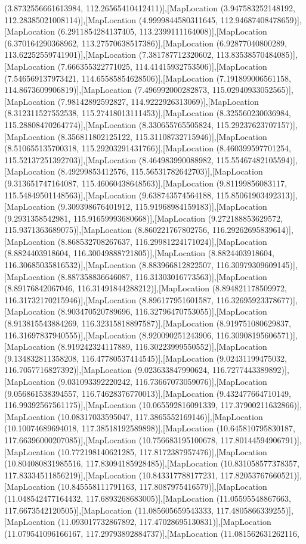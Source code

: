 (3.8732556661613984, 112.26565410412411)],[MapLocation (3.947583252148192, 112.28385021008114)],[MapLocation (4.9999844580311645, 112.94687408478659)],[MapLocation (6.2911854284137405, 113.2399111164008)],[MapLocation (6.370164290368962, 113.27570638517386)],[MapLocation (6.92877040800289, 113.62252559741901)],[MapLocation (7.381787712320602, 113.83538570484085)],[MapLocation (7.666355322771025, 114.41415932753506)],[MapLocation (7.546569137973421, 114.65585854628506)],[MapLocation (7.191899006561158, 114.8673609906819)],[MapLocation (7.496992000282873, 115.02940933052565)],[MapLocation (7.98142892592827, 114.9222926313069)],[MapLocation (8.312311527552538, 115.27418013111453)],[MapLocation (8.325560230036984, 115.28808470264774)],[MapLocation (8.330655765505824, 115.29237623707157)],[MapLocation (8.356811802125122, 115.31108732715946)],[MapLocation (8.510655135700318, 115.29203291431766)],[MapLocation (8.460399597701254, 115.52137251392703)],[MapLocation (8.464983990088982, 115.55467482105594)],[MapLocation (8.49299853412576, 115.56531782642703)],[MapLocation (9.313651747164087, 115.46060438648563)],[MapLocation (9.81199856083117, 115.54849501148563)],[MapLocation (9.638743574564188, 115.85061903492313)],[MapLocation (9.309398676401912, 115.91968984159183)],[MapLocation (9.2931358542981, 115.91659993680668)],[MapLocation (9.272188853629572, 115.9371363689075)],[MapLocation (8.860221767802756, 116.29262695839614)],[MapLocation (8.868532708267637, 116.29981224171024)],[MapLocation (8.8824403918604, 116.30049888721805)],[MapLocation (8.8824403918604, 116.30685035816532)],[MapLocation (8.883966812822507, 116.30979309609145)],[MapLocation (8.887358836646087, 116.31303016773563)],[MapLocation (8.89176842067046, 116.31491844288212)],[MapLocation (8.894821178509972, 116.31732170215946)],[MapLocation (8.896177951601587, 116.32695923378677)],[MapLocation (8.903470520789696, 116.32796470753055)],[MapLocation (8.913815543884269, 116.32315818897587)],[MapLocation (8.919751080629837, 116.31697837940555)],[MapLocation (8.920090251243906, 116.30908195606571)],[MapLocation (8.919242324117889, 116.30223999550552)],[MapLocation (9.134832811358208, 116.47780537414545)],[MapLocation (9.02431199475032, 116.7057716827392)],[MapLocation (9.023633847990624, 116.7277443389892)],[MapLocation (9.031093392220242, 116.73667073059076)],[MapLocation (9.056861538394557, 116.74628376770013)],[MapLocation (9.432477664710149, 116.99392567561175)],[MapLocation (10.065592816091339, 117.37900211632866)],[MapLocation (10.08317033595047, 117.3865552169146)],[MapLocation (10.10074689694018, 117.38518192589898)],[MapLocation (10.645810795830187, 117.66396000207085)],[MapLocation (10.756683195100678, 117.80144594906791)],[MapLocation (10.772198140621285, 117.8172387957476)],[MapLocation (10.804080831985516, 117.83094185928485)],[MapLocation (10.831058577378357, 117.83334511856219)],[MapLocation (10.843317788177231, 117.82053767660521)],[MapLocation (10.845558111791163, 117.8087975416579)],[MapLocation (11.048542477164432, 117.6893268683005)],[MapLocation (11.05595548867663, 117.6673542120505)],[MapLocation (11.085605659543333, 117.4805866339255)],[MapLocation (11.093017732867892, 117.47028695130831)],[MapLocation (11.079541096166167, 117.29793892884737)],[MapLocation (11.081562631262116, 